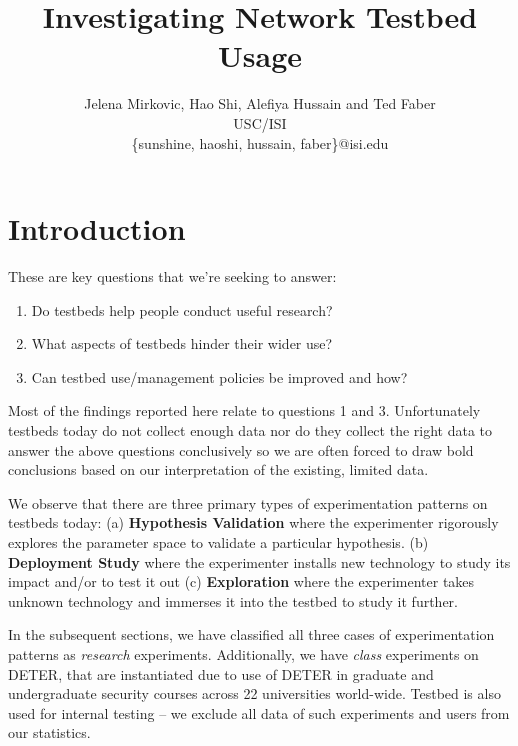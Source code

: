 \documentclass[10pt]{article}
\begin{document}
\normalsize



\clearpage
{}

\title{Investigating Network Testbed Usage}
\author{Jelena Mirkovic, Hao Shi, Alefiya Hussain and Ted Faber\\
USC/ISI\\
\{sunshine, haoshi, hussain, faber\}@isi.edu
}

\maketitle
\begin{abstract}
\end{abstract}
\section{Introduction}

These are key questions that we're seeking to answer:
\begin{enumerate} 
\item Do testbeds help people conduct useful research?
\item What aspects of testbeds hinder their wider use?
\item Can testbed use/management policies be improved and how?
\end{enumerate}
Most of the findings reported here relate to questions 1 and 3. Unfortunately testbeds today
do not collect enough data nor do they collect the right data to answer the above questions
conclusively so we are often forced to draw bold conclusions based on our interpretation of the
existing, limited data.

We observe that there are three primary types of experimentation patterns 
 on testbeds today: (a) {\bf Hypothesis Validation} where the experimenter
 rigorously explores the parameter space to validate 
  a particular hypothesis. 
(b) {\bf Deployment Study} where the experimenter 
 installs new technology to study its impact and/or to test it out
(c) {\bf Exploration} where the experimenter takes 
 unknown technology and immerses it into the testbed to study it further.

In the subsequent sections, we have classified 
 all three cases of experimentation patterns as 
{\it research} experiments. 
Additionally, we have {\it class} experiments
 on DETER, that are instantiated due to use of DETER in graduate and undergraduate
 security courses across 22 universities world-wide. Testbed is also used for internal
 testing -- we exclude all data of such experiments and users from our statistics.
\end{document}
